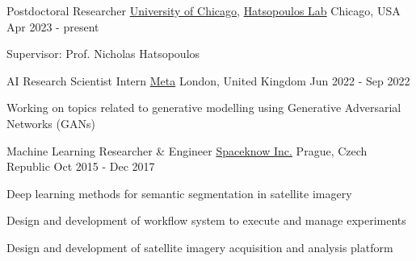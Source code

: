 

\begin{cventries}

\cventry
{Postdoctoral Researcher} %
{\href{https://www.uchicago.edu}{University of Chicago}, \href{https://hatsopouloslab.uchicago.edu}{Hatsopoulos Lab}} %
{Chicago, USA} %
{Apr 2023 - present} %
{
	\begin{cvitems} %
		\item {Supervisor: Prof. Nicholas Hatsopoulos}
	\end{cvitems}
}

  \cventry
    {AI Research Scientist Intern} %
    {\href{https://about.facebook.com}{Meta}} %
    {London, United Kingdom} %
    {Jun 2022 - Sep 2022} %
    {
      \begin{cvitems} %
        \item {Working on topics related to generative modelling using Generative Adversarial Networks (GANs)}
      \end{cvitems}
    }

\cventry
{Machine Learning Researcher \& Engineer} %
{\href{http://spaceknow.com}{Spaceknow Inc.}} %
{Prague, Czech Republic} %
{Oct 2015 - Dec 2017} %
{
	\begin{cvitems} %
		\item {Deep learning methods for semantic segmentation in satellite imagery %
		}
		\item {Design and development of workflow system to execute and manage experiments}
		\item {Design and development of satellite imagery acquisition and analysis platform}
	\end{cvitems}
}


\end{cventries}
